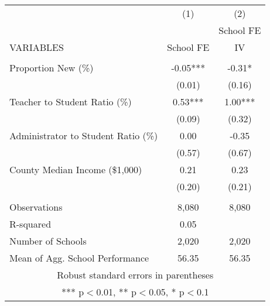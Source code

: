 \begin{tabular}{lcc}
\hline\hline
 & (1) & (2) \\
 &  & School FE \\
VARIABLES & School FE & IV \\ \hline
 &  &  \\
Proportion New (\%) & -0.05*** & -0.31* \\
 & (0.01) & (0.16) \\
Teacher to Student Ratio (\%) & 0.53*** & 1.00*** \\
 & (0.09) & (0.32) \\
Administrator to Student Ratio (\%) & 0.00 & -0.35 \\
 & (0.57) & (0.67) \\
County Median Income (\$1,000) & 0.21 & 0.23 \\
 & (0.20) & (0.21) \\
 &  &  \\
Observations & 8,080 & 8,080 \\
R-squared & 0.05 &  \\
Number of Schools & 2,020 & 2,020 \\ 
Mean of Agg. School Performance & 56.35 & 56.35\\ \hline\hline
\multicolumn{3}{c}{ Robust standard errors in parentheses} \\
\multicolumn{3}{c}{ *** p$<$0.01, ** p$<$0.05, * p$<$0.1} \\
\end{tabular}
